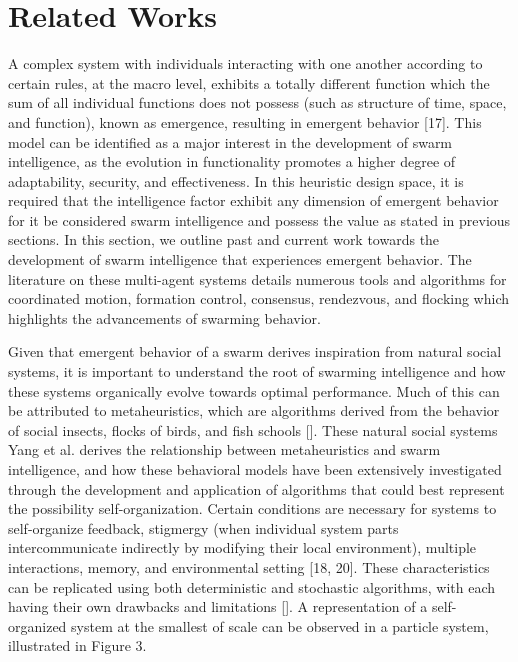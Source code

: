 \section*{Related Works}
A complex system with individuals interacting with one another according to certain rules, at the macro level, exhibits a totally different function which the sum of all individual functions does not possess (such as structure of time, space, and function), known as emergence, resulting in emergent behavior [17]. This model can be identified as a major interest in the development of swarm intelligence, as the evolution in functionality promotes a higher degree of adaptability, security, and effectiveness. In this heuristic design space, it is required that the intelligence factor exhibit any dimension of emergent behavior for it be considered swarm intelligence and possess the value as stated in previous sections. In this section, we outline past and current work towards the development of swarm intelligence that experiences emergent behavior. The literature on these multi-agent systems details numerous tools and algorithms for coordinated motion, formation control, consensus, rendezvous, and flocking which highlights the advancements of swarming behavior. 


Given that emergent behavior of a swarm derives inspiration from natural social systems, it is important to understand the root of swarming intelligence and how these systems organically evolve towards optimal performance. Much of this can be attributed to metaheuristics, which are algorithms derived from the behavior of social insects, flocks of birds, and fish schools []. These natural social systems Yang et al. derives the relationship between metaheuristics and swarm intelligence, and how these behavioral models have been extensively investigated through the development and application of algorithms that could best represent the possibility self-organization. Certain conditions are necessary for systems to self-organize feedback, stigmergy (when individual system parts intercommunicate indirectly by modifying their local environment), multiple interactions, memory, and environmental setting [18, 20]. These characteristics can be replicated using both deterministic and stochastic algorithms, with each having their own drawbacks and limitations []. A representation of a self-organized system at the smallest of scale can be observed in a particle system, illustrated in Figure 3.

